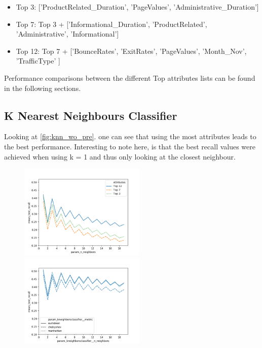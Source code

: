\documentclass{article}
\newcommand{\secref}[1]{\autoref{#1}. \texit{\nameref{#1}}}
\begin{document}
\begin{itemize}
    \item Top 3: ['ProductRelated\_Duration', 'PageValues', 'Administrative\_Duration']
    \item Top 7: Top 3 + ['Informational\_Duration',  'ProductRelated', 'Administrative', 'Informational']
    \item Top 12: Top 7 +  ['BounceRates', 'ExitRates', 'PageValues', 'Month\_Nov', 'TrafficType' ]
\end{itemize}
Performance comparisons between the different Top attributes lists can be found in the following sections.



\subsection{K Nearest Neighbours Classifier}
Looking at \secref{fig:knn_wo_pre} one can see that using the most attributes leads to the best performance.  Interesting to note here, is that the best recall values were achieved when using k = 1 and thus only looking at the closest neighbour.

\begin{figure}
\begin{floatrow}
    {\includegraphics[width=6cm]{plots/knn_wo_preprocessing.png}\label{fig:knn_wo_pre}}
    {\includegraphics[width=6cm]{plots/knn_uniform_metric_comparison.png}\label{fig:knn_w_pre}}
\end{floatrow}
\end{figure}
\end{document}
